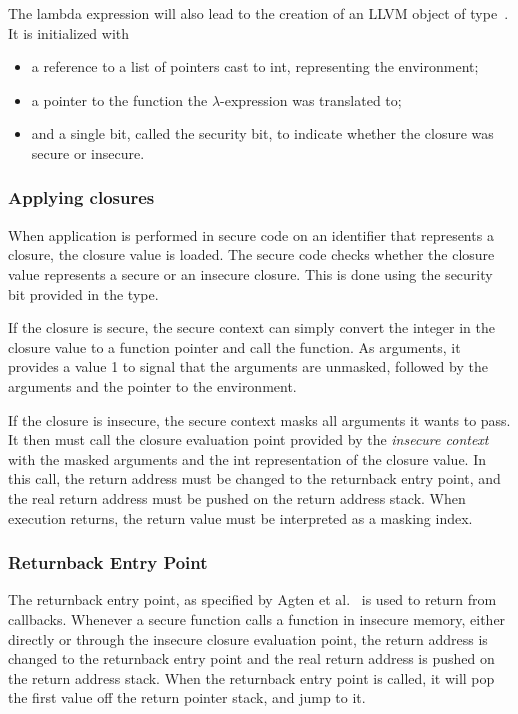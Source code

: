 The lambda expression will also lead to the creation of an LLVM object of type\ .
It is initialized with
\begin{itemize}
\item a reference to a list of pointers cast to int, representing the environment;
\item a pointer to the function the $\lambda$-expression was translated to;
\item and a single bit, called the security bit, to indicate whether the closure was secure or insecure.
\end{itemize}

\subsubsection{Applying closures}
When application is performed in secure code on an identifier that represents a closure, the closure value is loaded.
The secure code checks whether the closure value represents a secure or an insecure closure.
This is done using the security bit provided in the  type.

If the closure is secure, the secure context can simply convert the integer in the closure value to a function pointer and call the function.
As arguments, it provides a value 1 to signal that the arguments are unmasked, followed by the arguments and the pointer to the environment.

If the closure is insecure, the secure context masks all arguments it wants to pass. It then must call the closure evaluation point provided by the \emph{insecure context} with the masked arguments and the int representation of the closure value.
In this call, the return address must be changed to the returnback entry point, and the real return address must be pushed on the return address stack.
When execution returns, the return value must be interpreted as a masking index.

\subsubsection{Returnback Entry Point}
The returnback entry point, as specified by Agten et al.~\cite{Agten:2012:SCM:2354412.2355247} is used to return from callbacks.
Whenever a secure function calls a function in insecure memory, either directly or through the insecure closure evaluation point, the return address is changed to the returnback entry point and the real return address is pushed on the return address stack. When the returnback entry point is called, it will pop the first value off the return pointer stack, and jump to it.

